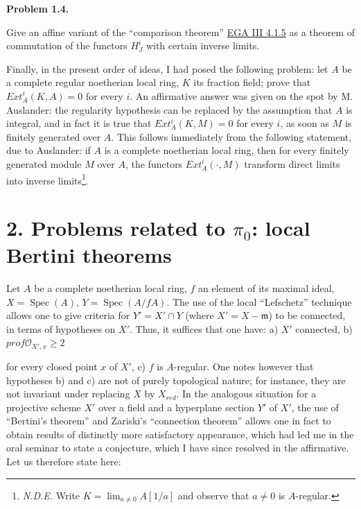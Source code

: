 \documentclass[
  11pt,
  a4paper,
]{book}
\begin{document}
\textbf{Problem 1.4.}

Give an affine variant of the ``comparison theorem''
\href{https://jcreinhold.github.io/ega/iii/11-ch3-04-fundamental-theorem-proper-morphisms.html\#41-the-fundamental-theorem}{EGA
III 4.1.5} as a theorem of commutation of the functors \(H^{i}_{J}\)
with certain inverse limits.

Finally, in the present order of ideas, I had posed the following
problem: let \(A\) be a complete regular noetherian local ring, \(K\)
its fraction field; prove that \(Ext^{i}_{A}(K, A) = 0\) for every
\(i\). An affirmative answer was given on the spot by M. Auslander: the
regularity hypothesis can be replaced by the assumption that \(A\) is
integral, and in fact it is true that \(Ext^{i}_{A}(K, M) = 0\) for
every \(i\), as soon as \(M\) is finitely generated over \(A\). This
follows immediately from the following statement, due to Auslander: if
\(A\) is a complete noetherian local ring, then for every finitely
generated module \(M\) over \(A\), the functors
\(Ext^{i}_{A}(\cdot, M)\) transform direct limits into inverse
limits\footnote{\emph{N.D.E.} Write \(K = \lim_{a \neq 0} A[1/a]\) and
  observe that \(a \neq 0\) is \(A\)-regular.}.

\section{\texorpdfstring{2. Problems related to \(\pi_{0}\): local
Bertini
theorems}{2. Problems related to \textbackslash pi\_\{0\}: local Bertini theorems}}\label{problems-related-to-pi_0-local-bertini-theorems}

Let \(A\) be a complete noetherian local ring, \(f\) an element of its
maximal ideal, \(X = \operatorname{Spec}(A)\), \(Y =
\operatorname{Spec}(A/fA)\). The use of the local ``Lefschetz''
technique allows one to give criteria for \(Y' = X' \cap Y\) (where
\(X' = X - {\mathfrak{m}}\)) to be connected, in terms of hypotheses on
\(X'\). Thus, it suffices that one have: a) \(X'\) connected, b)
\(prof \mathcal{O}_{X',x} \geqslant 2\)

for every closed point \(x\) of \(X'\), c) \(f\) is \(A\)-regular. One
notes however that hypotheses b) and c) are not of purely topological
nature; for instance, they are not invariant under replacing \(X\) by
\(X_{red}\). In the analogous situation for a projective scheme \(X'\)
over a field and a hyperplane section \(Y'\) of \(X'\), the use of
``Bertini's theorem'' and Zariski's ``connection theorem'' allows one in
fact to obtain results of distinctly more satisfactory appearance, which
had led me in the oral seminar to state a conjecture, which I have since
resolved in the affirmative. Let us therefore state here:
\end{document}
